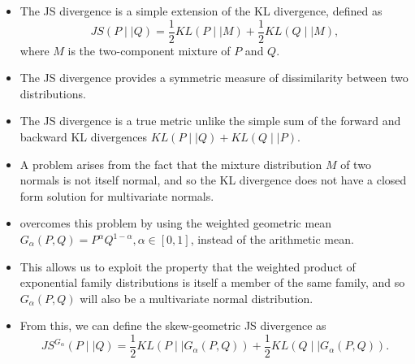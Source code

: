 \documentclass{article}
\numberwithin{equation}{section}
\begin{document}
\begin{itemize}
  \item The JS divergence is a simple extension of the KL divergence, defined as
    \begin{equation} \label{eq:js}
      JS(P \mid\mid Q) = \frac{1}{2} KL(P \mid\mid M) + \frac{1}{2} KL(Q \mid\mid M),
    \end{equation}
    where $M$ is the two-component mixture of $P$ and $Q$. 
  \item The JS divergence provides a symmetric measure of dissimilarity between two distributions.
  \item The JS divergence is a true metric unlike the simple sum of the forward and backward KL divergences $KL(P \mid\mid Q) + KL(Q \mid\mid P)$. %
  \item A problem arises from the fact that the mixture distribution $M$ of two normals is not itself normal, and so the KL divergence does not have a closed form solution for multivariate normals.
  \item \citet{Nielsen2019} overcomes this problem by using the weighted geometric mean $G_{\alpha}(P, Q) = P^{\alpha} Q^{1 - \alpha}, \alpha \in [0, 1]$, instead of the arithmetic mean. 
  \item This allows us to exploit the property that the weighted product of exponential family distributions is itself a member of the same family, and so $G_{\alpha}(P, Q)$ will also be a multivariate normal distribution.
  \item From this, we can define the skew-geometric JS divergence as
    \begin{equation} \label{eq:js_norm}
      JS^{G_{\alpha}}(P \mid\mid Q) = \frac{1}{2} KL(P \mid\mid G_{\alpha}(P, Q)) + \frac{1}{2} KL(Q \mid\mid G_{\alpha}(P, Q)).

\end{equation}
\end{itemize}
\end{document}
